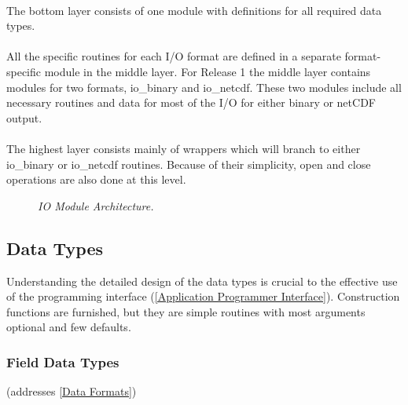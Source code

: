 \documentclass[11pt]{article}
\begin{document}
\paragraph{}
The bottom layer consists of one module with definitions for 
all required data types.  
\paragraph{}
All the specific routines for each I/O format are defined 
in a separate format-specific module in the middle layer.
For Release 1 the middle layer contains modules for two formats, 
io\_binary and io\_netcdf.  
These two modules include all necessary routines and 
data for most of the I/O for either binary or netCDF output.  
\paragraph{}
The highest layer consists mainly of wrappers which will 
branch to either io\_binary or io\_netcdf routines.  Because 
of their simplicity, open and close operations are also 
done at this level.
~\\
\begin{figure}
\begin{centering}
\hspace{0.1cm}
\caption{{\em IO Module Architecture.} \label{fig_modarch}}
\end{centering}
\end{figure}

\subsection{Data Types}
\label{Data Types}

Understanding the detailed design of the data types is crucial 
to the effective use of the programming interface 
(\ref{Application Programmer Interface}).  Construction functions 
are furnished, but they are simple routines with 
most arguments optional and few defaults.  

\subsubsection{Field Data Types}
(addresses \ref{Data Formats})

\end{document}
